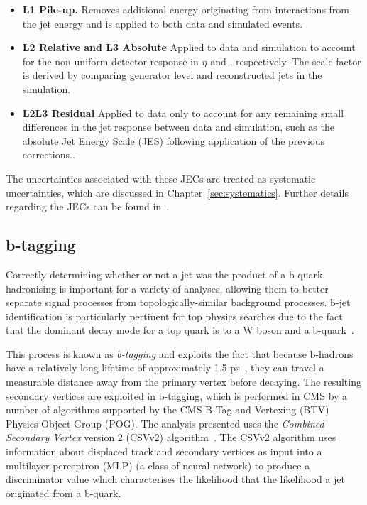 \begin{itemize}
\item \textbf{L1 Pile-up.} Removes additional energy originating from \PU interactions from the jet energy and is applied to both data and simulated events. 
\item \textbf{L2 Relative and L3 Absolute} Applied to data and simulation to account for the non-uniform detector response in $\eta$ and \pT, respectively. The scale factor is derived by comparing generator level and reconstructed jets in the simulation.
\item \textbf{L2L3 Residual} Applied to data only to account for any remaining small differences in the jet response between data and simulation, such as the absolute Jet Energy Scale (JES) following application of the previous corrections..
\end{itemize}

The uncertainties associated with these JECs are treated as systematic uncertainties, which are discussed in Chapter~\ref{sec:systematics}.
Further details regarding the JECs can be found in~\cite{Khachatryan:2016kdb}.

\newpage

\subsection{b-tagging}\label{subsec:objReco-bJets}
Correctly determining whether or not a jet was the product of a b-quark hadronising is important for a variety of analyses, allowing them to better separate signal processes from topologically-similar background processes.
b-jet identification is particularly pertinent for top physics searches due to the fact that the dominant decay mode for a top quark is to a W boson and a b-quark~\cite{Tanabashi:2018oca}.

This process is known as \emph{b-tagging} and exploits the fact that because b-hadrons have a relatively long lifetime of approximately 1.5 ps~\cite{Beringer:1900zz}, they can travel a measurable distance away from the primary vertex before decaying. 
The resulting secondary vertices are exploited in b-tagging, which is performed in CMS by a number of algorithms supported by the CMS B-Tag and Vertexing (BTV) Physics Object Group (POG).
The analysis presented uses the \emph{Combined Secondary Vertex} version 2 (CSVv2) algorithm~\cite{Sirunyan:2017ezt}.
The CSVv2 algorithm uses information about displaced track and secondary vertices as input into a multilayer perceptron (MLP) (a class of neural network) to produce a discriminator value which characterises the likelihood that the likelihood a jet originated from a b-quark.

